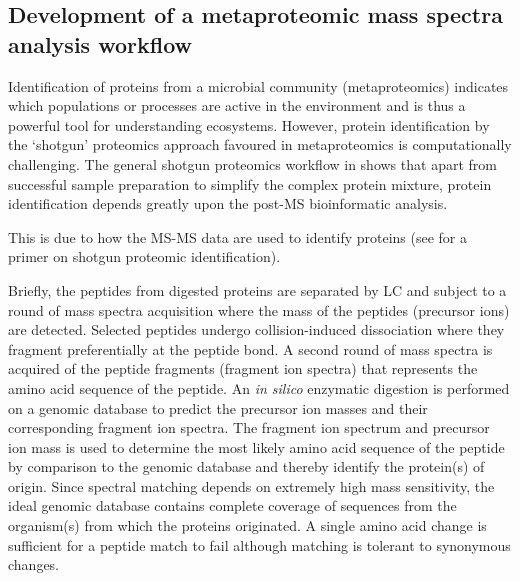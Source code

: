 \subsection[Development of a metaproteomic mass spectra analysis workflow ]{Development of a metaproteomic mass spectra analysis workflow }

Identification of proteins from a microbial community (metaproteomics) indicates which populations or processes are active in the environment and is thus a powerful tool for understanding ecosystems.
However, protein identification by the `shotgun' proteomics approach favoured in metaproteomics \cite{Ram2005} is computationally challenging.
The general shotgun proteomics workflow in  shows that apart from successful sample preparation to simplify the complex protein mixture, protein identification depends greatly upon the post-\ac{MS} bioinformatic analysis.

This is due to how the \ac{MS-MS} data are used to identify proteins (see \citet{Marcotte2007} for a primer on shotgun proteomic identification).

Briefly, the peptides from digested proteins are separated by \ac{LC} and subject to a round of mass spectra acquisition where the mass of the peptides (precursor ions) are detected.
Selected peptides undergo collision-induced dissociation where they fragment preferentially at the peptide bond.
A second round of mass spectra is acquired of the peptide fragments (fragment ion spectra) that represents the amino acid sequence of the peptide.
An \emph{in silico} enzymatic digestion is performed on a genomic database to predict the precursor ion masses and their corresponding fragment ion spectra.
The fragment ion spectrum and precursor ion mass is used to determine the most likely amino acid sequence of the peptide by comparison to the genomic database and thereby identify the protein(s) of origin.
Since spectral matching depends on extremely high mass sensitivity, the ideal genomic database contains complete coverage of sequences from the organism(s) from which the proteins originated. 
A single amino acid change is sufficient for a peptide match to fail although matching is tolerant to synonymous changes.

